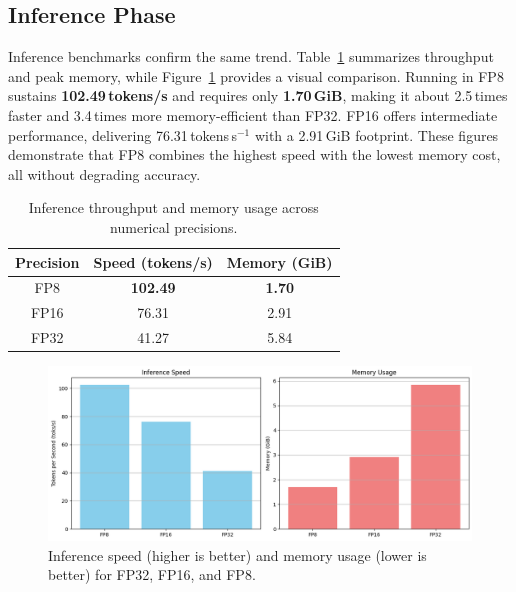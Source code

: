 \subsection{Inference Phase}
Inference benchmarks confirm the same trend. Table~\ref{tab:inference-benchmark} summarizes throughput and peak memory, while Figure~\ref{fig:inference_benchmark} provides a visual comparison. Running in FP8 sustains \textbf{102.49\,tokens/s} and requires only \textbf{1.70\,GiB}, making it about 2.5\,times faster and 3.4\,times more memory-efficient than FP32. FP16 offers intermediate performance, delivering 76.31\,tokens\,s$^{-1}$ with a 2.91\,GiB footprint. These figures demonstrate that FP8 combines the highest speed with the lowest memory cost, all without degrading accuracy.

\begin{table}[h]
    \centering
    \begin{tabular}{|c|c|c|}
        \hline
        \textbf{Precision} & \textbf{Speed (tokens/s)} & \textbf{Memory (GiB)} \\
        \hline
        FP8  & \textbf{102.49} & \textbf{1.70} \\
        FP16 & 76.31           & 2.91          \\
        FP32 & 41.27           & 5.84          \\
        \hline
    \end{tabular}
    \caption{Inference throughput and memory usage across numerical precisions.}
    \label{tab:inference-benchmark}
\end{table}

\begin{figure}[h]
    \centering
    \includegraphics[width=\linewidth]{figures/c4/inference_benchmark.png}
    \caption{Inference speed (higher is better) and memory usage (lower is better) for FP32, FP16, and FP8.}
    \label{fig:inference_benchmark}
\end{figure}
